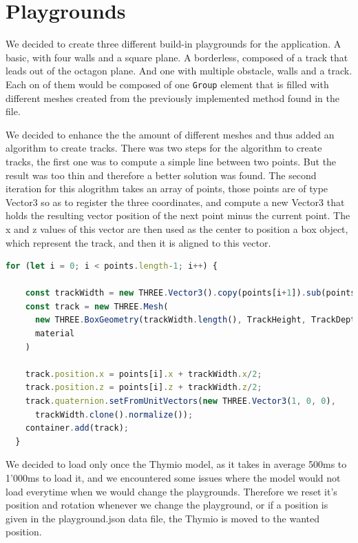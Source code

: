 \documentclass{scrbook}
\begin{document}
\section{Playgrounds}

We decided to create three different build-in playgrounds for the application. A basic, with four walls and a square plane. A borderless, composed of a track that leads out of the octagon plane. And one with multiple obstacle, walls and a track. 
Each on of them would be composed of one \texttt{Group} element that is filled with different meshes created from the previously implemented method found in the  file.

We decided to enhance the the amount of different meshes and thus added an algorithm to create tracks. There was two steps for the algorithm to create tracks, the first one was to compute a simple line between two points. 
But the result was too thin and therefore a better solution was found.
The second iteration for this alogrithm takes an array of points, those points are of type Vector3 so as to register the three coordinates, and compute 
a new Vector3 that holds the resulting vector position of the next point minus the current point. The x and z values of this vector are then used 
as the center to position a box object, which represent the track, and then it is aligned to this vector.
\begin{lstlisting}[language=JavaScript, basicstyle=\ttfamily\small]
  for (let i = 0; i < points.length-1; i++) {

    const trackWidth = new THREE.Vector3().copy(points[i+1]).sub(points[i]);
    const track = new THREE.Mesh(
      new THREE.BoxGeometry(trackWidth.length(), TrackHeight, TrackDepth),
      material
    )

    track.position.x = points[i].x + trackWidth.x/2;
    track.position.z = points[i].z + trackWidth.z/2;
    track.quaternion.setFromUnitVectors(new THREE.Vector3(1, 0, 0), 
      trackWidth.clone().normalize());
    container.add(track);      
  }
\end{lstlisting} 

We decided to load only once the Thymio model, as it takes in average 500ms to 1'000ms to load it, and we encountered some issues where the model would not load everytime when we would change the playgrounds.
Therefore we reset it's position and rotation whenever we change the playground, or if a position is given in the playground.json data file, the Thymio is moved to the wanted position.
\end{document}
